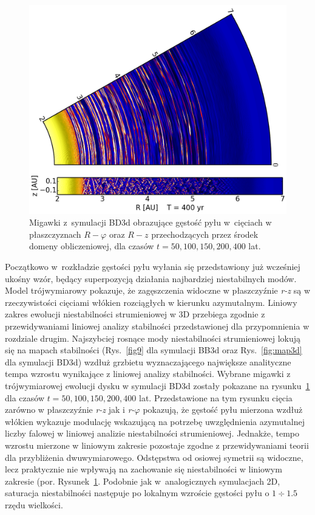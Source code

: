 \begin{figure}
   \includegraphics[width=0.44\linewidth]{figures/slice_nosg_05}
   \caption{
      Migawki z~symulacji BD3d obrazujące gęstość pyłu w~cięciach w
      płaszczyznach $R -\varphi$ oraz $R - z$ przechodzących przez środek 
   domeny obliczeniowej, dla czasów $t= 50, 100, 150, 200, 400$ lat.}
   \label{fig:slicenosg}
\end{figure}
%
Początkowo w~rozkładzie gęstości pyłu wyłania się przedstawiony już wcześniej
ukośny wzór, będący superpozycją działania najbardziej niestabilnych modów.
Model trójwymiarowy pokazuje, że zagęszczenia widoczne w płaszczyźnie
\textit{r-z} są w rzeczywistości cięciami włókien rozciągłych w kierunku
azymutalnym. Liniowy zakres ewolucji niestabilności strumieniowej w 3D przebiega
zgodnie z przewidywaniami liniowej analizy stabilności przedstawionej dla
przypomnienia w rozdziale drugim. Najszybciej rosnące mody niestabilności
strumieniowej lokują się na mapach stabilności (Rys.~\ref{fig9} dla symulacji
BB3d oraz Rys.~\ref{fig:map3d} dla symulacji BD3d) wzdłuż grzbietu
wyznaczającego największe analityczne tempa wzrostu wynikające z liniowej
analizy stabilności. Wybrane migawki z trójwymiarowej
ewolucji dysku w symulacji BD3d zostały pokazane na rysunku~\ref{fig:slicenosg}
dla czasów $t =  50, 100, 150, 200, 400$ lat. Przedstawione na tym rysunku
cięcia zarówno w płaszczyźnie \textit{r-z} jak i \textit{r-}$\varphi$ pokazują, że
gęstość pyłu mierzona wzdłuż włókien wykazuje modulację wskazującą na
potrzebę uwzględnienia azymutalnej liczby falowej w liniowej analizie
niestabilności strumieniowej. Jednakże, tempo wzrostu mierzone w liniowym
zakresie pozostaje zgodne z przewidywaniami teorii dla przybliżenia
dwuwymiarowego. Odstępstwa od osiowej symetrii są widoczne, lecz praktycznie nie
wpływają na zachowanie się niestabilności w liniowym zakresie (por.
Rysunek~\ref{fig:slicenosg}. Podobnie jak w~analogicznych symulacjach 2D,
saturacja niestabilności następuje po lokalnym wzroście gęstości pyłu o
$1\div1.5$ rzędu wielkości.
%
